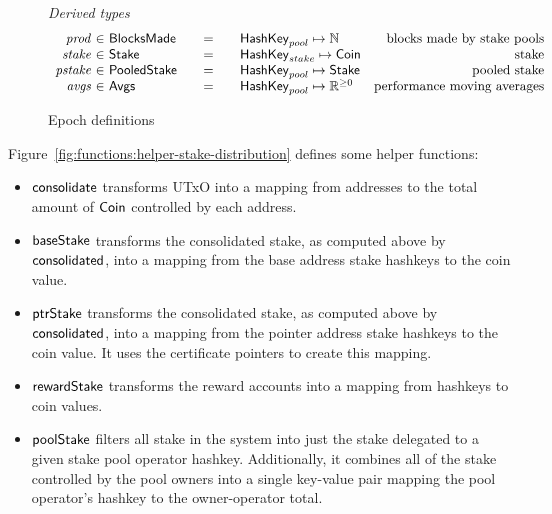 \begin{figure}[htb]
  \emph{Derived types}
  \begin{equation*}
    \begin{array}{r@{~\in~}l@{\qquad=\qquad}lr}
      \var{prod}
      & \BlocksMade
      & \HashKey_{pool} \mapsto \N
      & \text{blocks made by stake pools} \\
      \var{stake}
      & \Stake
      & \HashKey_{stake} \mapsto \Coin
      & \text{stake} \\
      \var{pstake}
      & \PooledStake
      & \HashKey_{pool} \mapsto \Stake
      & \text{pooled stake} \\
      \var{avgs}
      & \Avgs
      & \HashKey_{pool} \mapsto \Rnn
      & \text{performance moving averages} \\
    \end{array}
  \end{equation*}
  \caption{Epoch definitions}
  \label{fig:epoch-defs}
\end{figure}

Figure~\ref{fig:functions:helper-stake-distribution} defines some helper functions:
\begin{itemize}
  \item $\mathsf{consolidate}$ transforms UTxO into a mapping from addresses to the total amount
    of $\mathsf{Coin}$ controlled by each address.
  \item $\mathsf{baseStake}$ transforms the consolidated stake, as computed above by
    $\mathsf{consolidated}$, into a mapping from the base address stake hashkeys to the coin value.
  \item $\mathsf{ptrStake}$ transforms the consolidated stake, as computed above by
    $\mathsf{consolidated}$, into a mapping from the pointer address stake hashkeys to the coin value.
    It uses the certificate pointers to create this mapping.
  \item $\mathsf{rewardStake}$ transforms the reward accounts into a mapping from hashkeys to coin
    values.
  \item $\mathsf{poolStake}$ filters all stake in the system into just the stake delegated to a given
    stake pool operator hashkey.  Additionally, it combines all of the stake controlled by the
    pool owners into a single key-value pair mapping the pool operator's hashkey to the
    owner-operator total.
\end{itemize}

